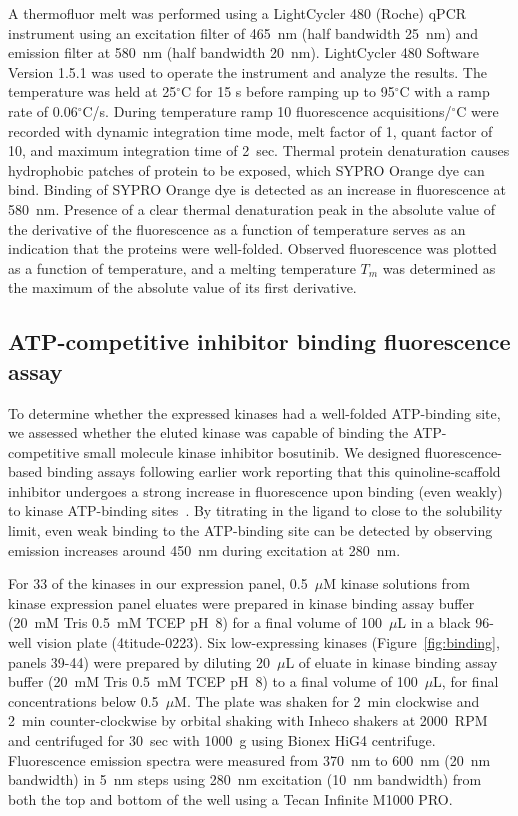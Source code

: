 \documentclass[phd,tocprelim]{cornell}
\begin{document}
A thermofluor melt was performed using a LightCycler 480 (Roche) qPCR instrument using an excitation filter of 465~nm (half bandwidth 25~nm) and emission filter at 580~nm (half bandwidth 20~nm). 
LightCycler 480 Software Version 1.5.1 was used to operate the instrument and analyze the results. 
The temperature was held at 25$^{\circ}$C for 15 s before ramping up to 95$^{\circ}$C with a ramp rate of 0.06$^{\circ}$C/s.  
During temperature ramp 10 fluorescence acquisitions/$^{\circ}$C were recorded with dynamic integration time mode, melt factor of 1, quant factor of 10, and maximum integration time of 2~sec.  
Thermal protein denaturation causes hydrophobic patches of protein to be exposed, which SYPRO Orange dye can bind. 
Binding of SYPRO Orange dye is detected as an increase in fluorescence at 580~nm. 
Presence of a clear thermal denaturation peak in the absolute value of the derivative of the fluorescence as a function of temperature serves as an indication that the proteins were well-folded. 
Observed fluorescence was plotted as a function of temperature, and a melting temperature $T_m$ was determined as the maximum of the absolute value of its first derivative. 

\subsection{ATP-competitive inhibitor binding fluorescence assay}

To determine whether the expressed kinases had a well-folded ATP-binding site, we assessed whether the eluted kinase was capable of binding the ATP-competitive small molecule kinase inhibitor bosutinib.
We designed fluorescence-based binding assays following earlier work reporting that this quinoline-scaffold inhibitor undergoes a strong increase in fluorescence upon binding (even weakly) to kinase ATP-binding sites~\citep{levinson-boxer:plos-one:2012:bosutinib}.
By titrating in the ligand to close to the solubility limit, even weak binding to the ATP-binding site can be detected by observing emission increases around 450~nm during excitation at 280~nm.

For 33 of the kinases in our expression panel, 0.5~$\mu$M kinase solutions from kinase expression panel eluates were prepared in kinase binding assay buffer (20~mM Tris 0.5~mM TCEP pH~8) for a final volume of 100~$\mu$L in a black 96-well vision plate (4titude-0223). 
Six low-expressing kinases (Figure~\ref{fig:binding}, panels 39-44) were prepared by diluting 20~$\mu$L of eluate in kinase binding assay buffer (20~mM Tris 0.5~mM TCEP pH~8) to a final volume of 100~$\mu$L, for final concentrations below 0.5~$\mu$M. 
The plate was shaken for 2~min clockwise and 2~min counter-clockwise by orbital shaking with Inheco shakers at 2000~RPM and centrifuged for 30~sec with 1000~g using Bionex HiG4 centrifuge. 
Fluorescence emission spectra were measured from 370~nm to 600~nm (20~nm bandwidth) in 5~nm steps using 280~nm excitation (10~nm bandwidth) from both the top and bottom of the well using a Tecan Infinite M1000 PRO. 
\end{document}
